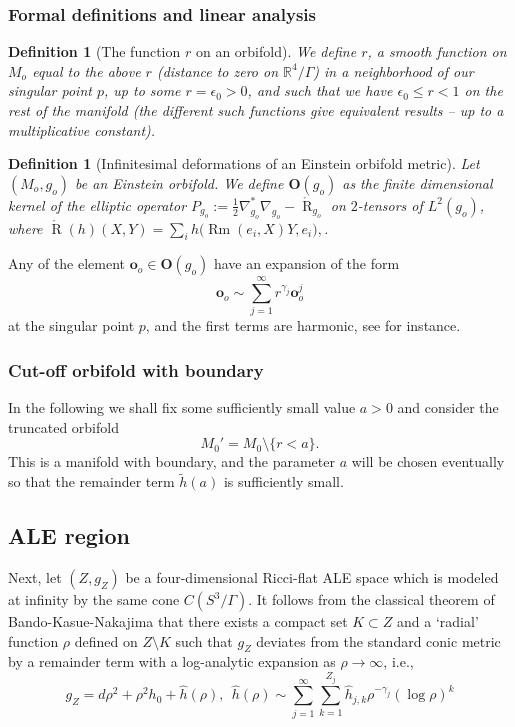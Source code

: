 \documentclass[12pt]{article}
\newtheorem{defn}[thm]{Definition}
\DeclareMathOperator{\Rm}{\operatorname{Rm}}
\DeclareMathOperator{\R}{\operatorname{R}}
\newcommand{\RR}{\mathbb R}
\begin{document}
\subsubsection{Formal definitions and linear analysis}
\begin{defn}[The function $r$ on an orbifold]\label{ro}
    We define $r$, a smooth function on $M_o$ equal to the above $r$ (distance to zero on $\RR^4\slash\Gamma$) in a neighborhood of our singular point $p$, up to some $r=\epsilon_0>0$, and such that we have $\epsilon_0\leqslant r<1$ on the rest of the manifold (the different such functions give equivalent results -- up to a multiplicative constant). 
\end{defn}

\begin{defn}[Infinitesimal deformations of an Einstein orbifold metric]
    Let $(M_o,g_o)$ be an Einstein orbifold. We define $\mathbf{O}(g_o)$ as the finite dimensional kernel of the elliptic operator $P_{g_o}:= \frac{1}{2}\nabla^*_{g_o}\nabla_{g_o}- \mathring{\R}_{g_o}$ on $2$-tensors of $L^2(g_o)$, where  $\mathring{\R}(h)(X,Y)= \sum_i h\big(\Rm(e_i,X)Y,e_i\big),$.
\end{defn}

Any of the element $\mathbf{o}_o\in\mathbf{O}(g_o)$ have an expansion of the form
$$\mathbf{o}_o \sim \sum_{j=1}^\infty r^{\gamma_j} \mathbf{o}_o^j$$ at the singular point $p$, and the first terms are harmonic, see \cite{ozu2} for instance.

\subsubsection{Cut-off orbifold with boundary}

In the following we shall fix some sufficiently small value $a > 0$ and consider the truncated orbifold
\begin{equation}
M_0' = M_0 \setminus \{ r < a\}.
\label{truncorb}
\end{equation}
This is a manifold with boundary, and the parameter $a$ will be chosen eventually so that the remainder term
$\tilde{h}(a)$ is sufficiently small.

\subsection{ALE region}

Next, let $(Z, g_Z)$ be a four-dimensional Ricci-flat ALE space which is modeled at infinity by the same cone
$C(S^3/\Gamma)$.  It follows from the classical theorem of Bando-Kasue-Nakajima \cite{BKN} that there
exists a compact set $K \subset Z$ and a `radial' function $\rho$ defined on $Z \setminus K$ such that
$g_Z$ deviates from the standard conic metric by a remainder term with a log-analytic expansion as $\rho \to \infty$, i.e., 
\begin{equation}
g_Z = d\rho^2 + \rho^2 h_0 + \hat{h}(\rho), \ \ \hat{h}(\rho) \sim \sum_{j=1}^\infty\sum_{k=1}^{Z_j} \hat{h}_{j,k} \rho^{-\gamma_j} (\log \rho)^k
\label{gZ}
\end{equation}
\end{document}
